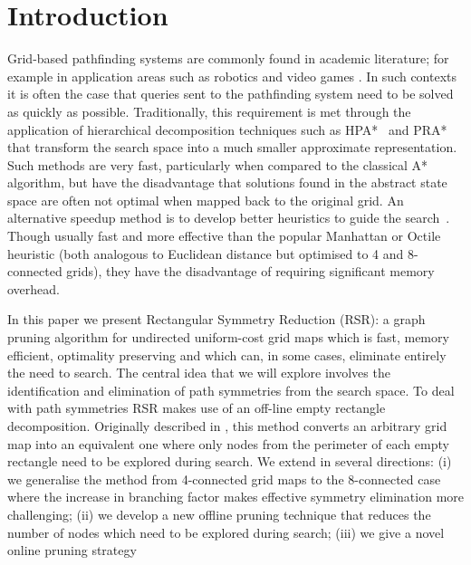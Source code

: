 \section{Introduction}
\label{sec:introduction}

Grid-based pathfinding systems are commonly found in academic literature; for
example in application areas such as robotics \cite{choset05} and video games
\cite{botea04,sturtevant05,bjornsson06}.  In such contexts it is often the case
that queries sent to the pathfinding system need to be solved as quickly as
possible.  Traditionally, this requirement is met through the application of
hierarchical decomposition techniques such as HPA*~\cite{botea04} and PRA*
~\cite{sturtevant05} that transform the search space into a much smaller
approximate representation.  Such methods are very fast, particularly when
compared to the classical A* algorithm, but have the disadvantage that solutions
found in the abstract state space are often not optimal when mapped back to the
original grid.  An alternative speedup method is to develop better
heuristics to guide the search~\cite{sturtevant09}.  Though usually fast and
more effective than the popular Manhattan or Octile heuristic (both analogous to
Euclidean distance but optimised to 4 and 8-connected grids), they have the
disadvantage of requiring significant memory overhead.
\par
In this paper we present Rectangular Symmetry Reduction (RSR): a graph pruning
algorithm for undirected uniform-cost grid maps which is fast, memory efficient,
optimality preserving and which can, in some cases, eliminate entirely the need
to search.  The central idea that we will explore involves the identification
and elimination of path symmetries from the search space. 
To deal with path symmetries RSR makes use of an off-line
empty rectangle decomposition. Originally described in \cite{harabor10}, this
method converts an arbitrary grid map into an equivalent one where only nodes
from the perimeter of each empty rectangle need to be explored during search.
We extend \cite{harabor10} in several directions: (i) we generalise the method
from 4-connected grid maps to the 8-connected case where the increase in
branching factor makes effective symmetry elimination more challenging; (ii) we
develop a new offline pruning technique that reduces the number of nodes which
need to be explored during search; (iii) we give a novel online pruning strategy
